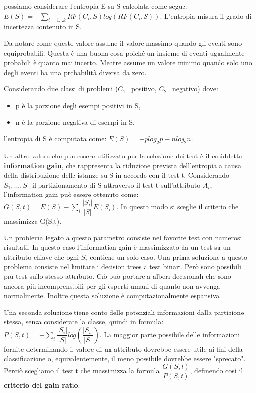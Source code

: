 \documentclass[a4paper]{extarticle}
\begin{document}
possiamo considerare l'entropia E su S calcolata come segue: $E(S) = -\sum_{i=1...k} RF(C_i,S)log(RF(C_i,S))$. L'entropia misura il grado di incertezza contenuto in S.

Da notare come questo valore assume il valore massimo quando gli eventi sono equiprobabili. Questa è una buona cosa poiché un insieme di eventi ugualmente probabili è quanto mai incerto. Mentre assume un valore minimo quando solo uno degli eventi ha una probabilità diversa da zero.

Considerando due classi di problemi ($C_1$=positivo, $C_2$=negativo) dove:
\begin{itemize}
\item p è la porzione degli esempi positivi in S,
\item n è la porzione negativa di esempi in S,
\end{itemize}

l'entropia di S è computata come: $E(S) = -p log_2 p - n log_2 n$.

Un altro valore che può essere utilizzato per la selezione dei test è il cosiddetto \textbf{information gain}, che rappresenta la riduzione prevista dell'entropia a causa della distribuzione delle istanze su S in accordo con il test t. Considerando $S_1,...,S_z$ il partizionamento di S attraverso il test t sull'attributo $A_i$, l'information gain può essere ottenuto come: $G(S,t) = E(S) - \sum_i \dfrac{|S_i|}{|S|}E(S_i)$. In questo modo si sceglie il criterio che massimizza G(S,t).

Un problema legato a questo parametro consiste nel favorire test con numerosi risultati. In questo caso l'information gain è massimizzato da un test su un attributo chiave che ogni $S_i$ contiene un solo caso. Una prima soluzione a questo problema consiste nel limitare i decision trees a test binari. Però sono possibili più test sullo stesso attributo. Ciò può portare a alberi decisionali che sono ancora più incomprensibili per gli esperti umani di quanto non avvenga normalmente. Inoltre questa soluzione è computazionalmente espansiva.

Una seconda soluzione tiene conto delle potenziali informazioni dalla partizione stessa, senza considerare la classe, quindi in formula: $P(S,t) = - \sum_i \dfrac{|S_i|}{|S|} log(\dfrac{|S_i|}{|S|})$. La maggior parte possibile delle informazioni fornite determinando il valore di un attributo dovrebbe essere utile ai fini della classificazione o, equivalentemente, il meno possibile dovrebbe essere "sprecato". Perciò scegliamo il test t che massimizza la formula $\dfrac{G(S,t)}{P(S,t)}$, definendo così il \textbf{criterio del gain ratio}.
\end{document}
